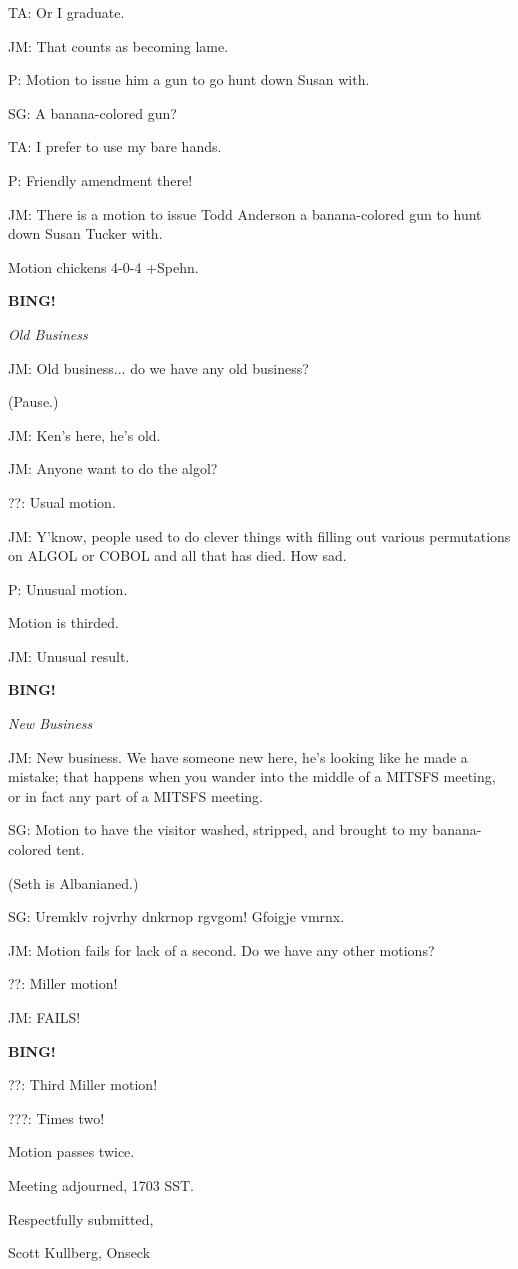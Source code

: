 \documentclass[12pt]{article}
\newcommand{\bing}{{\bf BING!} }
\newcommand{\goto}[1]{\bing \vskip 12pt \centerline{{\em{#1}}}}
\begin{document}
TA: Or I graduate.

JM: That counts as becoming lame.

P: Motion to issue him a gun to go hunt down Susan with.

SG: A banana-colored gun?

TA: I prefer to use my bare hands.

P: Friendly amendment there!

JM: There is a motion to issue Todd Anderson a banana-colored gun to hunt down Susan Tucker with.

Motion chickens 4-0-4 +Spehn.

\goto{Old Business}

JM: Old business... do we have any old business?

(Pause.)

JM: Ken's here, he's old.

JM: Anyone want to do the algol?

??: Usual motion.

JM: Y'know, people used to do clever things with filling out various permutations on ALGOL or COBOL and all that has died. How sad.

P: Unusual motion.

Motion is thirded.

JM: Unusual result.

\goto{New Business}

JM: New business. We have someone new here, he's looking like he made a mistake; that happens when you wander into the middle of a MITSFS meeting, or in fact any part of a MITSFS meeting.

SG: Motion to have the visitor washed, stripped, and brought to my banana-colored tent.

(Seth is Albanianed.)

SG: Uremklv rojvrhy dnkrnop rgvgom! Gfoigje vmrnx.

JM: Motion fails for lack of a second. Do we have any other motions?

??: Miller motion!

JM: FAILS!

\bing

??: Third Miller motion!

???: Times two!

Motion passes twice.

\vspace{12pt}

\noindent
Meeting adjourned, 1703 SST.

\vspace{18pt}

\centerline{Respectfully submitted,}
\centerline{Scott Kullberg, Onseck}
\end{document}
